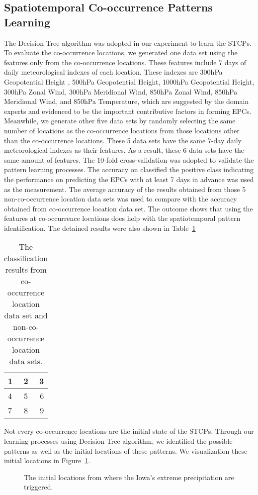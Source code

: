 \documentclass{acm_proc_article-sp}
\begin{document}
\subsection{Spatiotemporal Co-occurrence Patterns Learning}
The Decision Tree algorithm was adopted in our experiment to learn the STCPs. To evaluate the co-occurrence locations, we generated one data set using the features only from the co-occurrence locations. These features include 7 days of daily meteorological indexes of each location. These indexes are 300hPa Geopotential Height
, 500hPa Geopotential Height, 1000hPa Geopotential Height, 300hPa Zonal Wind, 300hPa Meridional Wind, 850hPa Zonal Wind, 850hPa Meridional Wind, and 850hPa Temperature, which are suggested by the domain experts and evidenced to be the important contributive factors in forming EPCs. Meanwhile, we generate other five data sets by randomly selecting the same number of locations as the co-occurrence locations from those locations other than the co-occurrence locations. These 5 data sets have the same 7-day daily meteorological indexes as their features. As a result, these 6 data sets have the same amount of features. 
\newline
The 10-fold cross-validation was adopted to validate the pattern learning processes. The accuracy on classified the positive class indicating the performance on predicting the EPCs with at least 7 days in advance was used as the measurement. The average accuracy of the results obtained from those 5 non-co-occurrence location data sets was used to compare with the accuracy obtained from co-occurrence location data set. The outcome shows that using the features at co-occurrence locations does help with the spatiotemporal pattern identification. The detained results were also shown in Table~\ref{tab:random}
\begin{table}
\centering
\caption{The classification results from co-occurrence location data set and non-co-occurrence location data sets.}
\begin{tabular}{| l | c | r |}
    \hline
    1 & 2 & 3 \\ \hline
    4 & 5 & 6 \\ \hline
    7 & 8 & 9 \\
    \hline
\end{tabular}
\label{tab:random}
\end{table}
\newline
Not every co-occurrence locations are the initial state of the STCPs. Through our learning processes using Decision Tree algorithm, we identified the possible patterns as well as the initial locations of these patterns. We visualization these initial locations in Figure~\ref{fig:inilocations}.
\begin{figure}  
\begin{center}  
\caption{The initial locations from where the Iowa's extreme precipitation are triggered.  \label{fig:inilocations}}  
\end{center}  
\end{figure}
    
\end{document}
